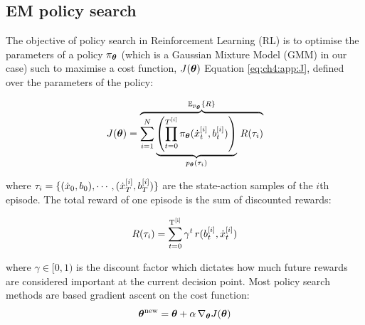 \begin{appendices}
\section{EM policy search}\label{app:lb}
The objective of policy search in Reinforcement Learning (RL) is to optimise the parameters of a policy $\pi_{\boldsymbol{\theta}}$
(which is a Gaussian Mixture Model (GMM) in our case) such to maximise a cost 
function, $J(\boldsymbol{\theta})$ Equation \ref{eq:ch4:app:J}, defined over the parameters of the policy:


\begin{align}\label{eq:ch4:app:J}
 J(\boldsymbol{\theta}) = \overbrace{\sum\limits_{i=1}^{N}   \underbrace{\left( \prod_{t=0}^{T^{[i]}} \pi_{\boldsymbol{\theta}}(\dot{x}^{[i]}_t,b^{[i]}_t) \right)}_{p_{\boldsymbol{\theta}}(\tau_i)} \, R(\tau_i)}^{\mathbb{E}_{p_{\boldsymbol{\theta}}}\{R\}} 
\end{align}

where $\tau_i = \{(\dot{x}_0,b_0),\cdots,(\dot{x}_T^{[i]},b_T^{[i]}) \}$ are the state-action samples of the $i$th episode. 
The total reward of one episode is the sum of discounted rewards:

\begin{equation}
 R(\tau_i) = \sum_{t=0}^{\mathrm{T^{[i]}}} \gamma^t \, r(b^{[i]}_t,\dot{x}^{[i]}_t)
\end{equation}

where $\gamma \in [0,1)$ is the discount factor which dictates how much future rewards are considered important 
at the current decision point.
Most policy search methods are based gradient ascent on the cost function:
\begin{equation}
   \boldsymbol{\theta}^{\mathrm{new}} =  \boldsymbol{\theta} + \alpha\,\nabla_{\boldsymbol{\theta}}J(\boldsymbol{\theta})
\end{equation}


\end{appendices}
